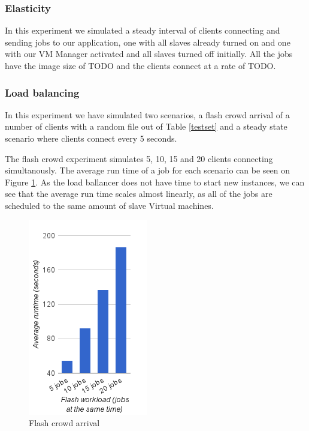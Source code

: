 
\subsubsection{Elasticity}
\label{elastic}
In this experiment we simulated a steady interval of clients connecting and sending jobs to our application, one with all slaves already turned on and one with our VM Manager activated and all slaves turned off initially. All the jobs have the image size of TODO and the clients connect at a rate of TODO.


\subsubsection{Load balancing}
In this experiment we have simulated two scenarios, a flash crowd arrival of a number of clients with a random file out of Table \ref{testset} and a steady state scenario where clients connect every 5 seconds. %

The flash crowd experiment simulates 5, 10, 15 and 20 clients connecting simultanously. The average run time of a job for each scenario can be seen on Figure \ref{flash}. As the load ballancer does not have time to start new instances, we can see that the average run time scales almost linearly, as all of the jobs are scheduled to the same amount of slave Virtual machines.

\begin{figure}
 \centering
 \label{flash}
 \includegraphics{flash-graph}
 \caption{Flash crowd arrival}
\end{figure}

